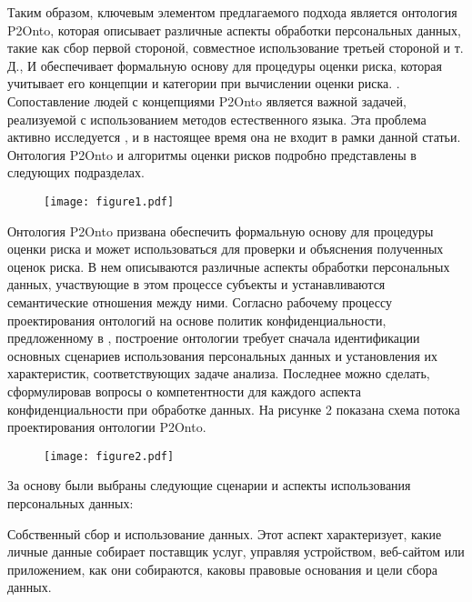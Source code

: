 \documentclass[../main]{subfiles}
\begin{document}
Таким образом, ключевым элементом предлагаемого подхода является онтология P2Onto, которая описывает различные аспекты обработки персональных данных, такие как сбор первой стороной, совместное использование третьей стороной и т. Д., И обеспечивает формальную основу для процедуры оценки риска, которая учитывает его концепции и категории при вычислении оценки риска. . Сопоставление людей с концепциями P2Onto является важной задачей, реализуемой с использованием методов естественного языка. Эта проблема активно исследуется \cite{MDPI18}, и в настоящее время она не входит в рамки данной статьи. Онтология P2Onto и алгоритмы оценки рисков подробно представлены в следующих подразделах.

\begin{figure}[H]
    \centering
    {\texttt{[image: figure1.pdf]}}
    \vspace{-\baselineskip}
\end{figure}

Онтология P2Onto призвана обеспечить формальную основу для процедуры оценки риска и может использоваться для проверки и объяснения полученных оценок риска. В нем описываются различные аспекты обработки персональных данных, участвующие в этом процессе субъекты и устанавливаются семантические отношения между ними. Согласно рабочему процессу проектирования онтологий на основе политик конфиденциальности, предложенному в \cite{MDPI8}, построение онтологии требует сначала идентификации основных сценариев использования персональных данных и установления их характеристик, соответствующих задаче анализа. Последнее можно сделать, сформулировав вопросы о компетентности для каждого аспекта конфиденциальности при обработке данных. На рисунке 2 показана схема потока проектирования онтологии P2Onto. 

\begin{figure}[H]
    \centering
    {\texttt{[image: figure2.pdf]}}
    \vspace{-\baselineskip}
\end{figure}

За основу были выбраны следующие сценарии и аспекты использования персональных данных:

Собственный сбор и использование данных. Этот аспект характеризует, какие личные данные собирает поставщик услуг, управляя устройством, веб-сайтом или приложением, как они собираются, каковы правовые основания и цели сбора данных.
\end{document}
